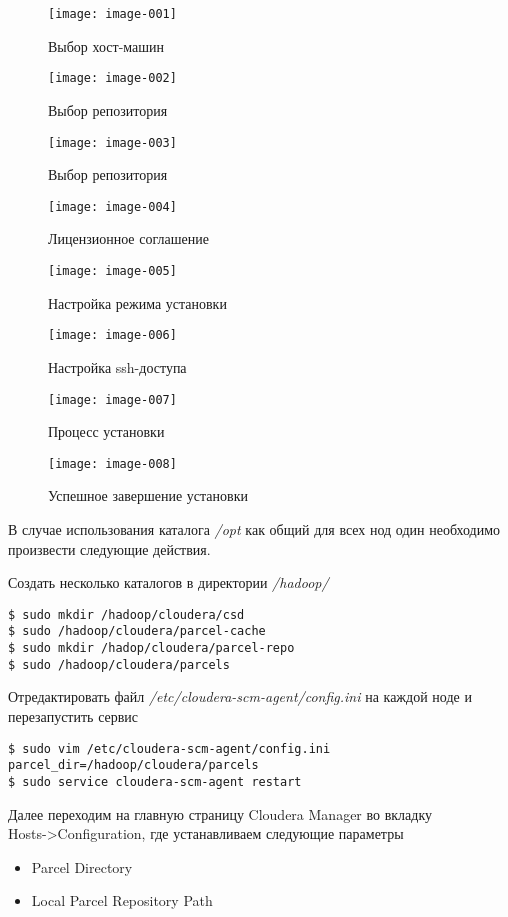 \newpage

\begin{figure}[ht!]
    \center
    \texttt{[image: image-001]}
    \caption{Выбор хост-машин}
    \texttt{[image: image-002]}
    \caption{Выбор репозитория}
\end{figure}

\newpage

\begin{figure}[ht!]
    \center
    \texttt{[image: image-003]}
    \caption{Выбор репозитория}
    \texttt{[image: image-004]}
    \caption{Лицензионное соглашение}
\end{figure}

\newpage

\begin{figure}[ht!]
    \center
    \texttt{[image: image-005]}
    \caption{Настройка режима установки}
    \texttt{[image: image-006]}
    \caption{Настройка ssh-доступа}
\end{figure}

\newpage

\begin{figure}[ht!]
    \center
    \texttt{[image: image-007]}
    \caption{Процесс установки}
    \texttt{[image: image-008]}
    \caption{Успешное завершение установки}
\end{figure}

В случае использования каталога \emph{/opt} как общий для всех нод один необходимо произвести 
следующие действия.

Создать несколько каталогов в директории \emph{/hadoop/}
\begin{lstlisting}
$ sudo mkdir /hadoop/cloudera/csd
$ sudo /hadoop/cloudera/parcel-cache
$ sudo mkdir /hadop/cloudera/parcel-repo
$ sudo /hadoop/cloudera/parcels
\end{lstlisting}
Отредактировать файл \emph{/etc/cloudera-scm-agent/config.ini}\cite{parcels} на каждой ноде и 
перезапустить сервис
\begin{lstlisting}
$ sudo vim /etc/cloudera-scm-agent/config.ini
parcel_dir=/hadoop/cloudera/parcels
$ sudo service cloudera-scm-agent restart
\end{lstlisting}

Далее переходим на главную страницу Cloudera Manager во вкладку \\
Hosts->Configuration, где устанавливаем следующие параметры
\begin{itemize}
    \item Parcel Directory
    \item Local Parcel Repository Path
\end{itemize}

